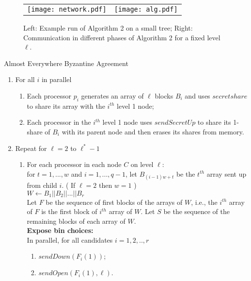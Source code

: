 \documentclass{sig-alternate}
\begin{document}
\begin{figure}[t]
\begin{center}
\begin{tabular}{ll}
\texttt{[image: network.pdf]} &
\texttt{[image: alg.pdf]}
\end{tabular}
\caption{Left: Example run of Algorithm 2 on a small tree; Right: Communication in different phases of Algorithm 2 for a fixed level $\ell$. }
\end{center}
\label{f:aeBA}
\end{figure}



\begin{algorithm} \label{aeBA}
\caption {Almost Everywhere Byzantine Agreement}
\begin{enumerate}
\item
For all $i$ in parallel
\begin{enumerate}
\item
 Each processor $p_i$ generates an array of  $\ell $ blocks  $B_i$ and  uses $secretshare$ to share its array with the $i^{th}$ level 1 node;
\item
Each processor in the $i^{th}$  level 1 node uses  $sendSecretUp$ to share its 1-share of $B_i$ with its parent node
and then erases its shares from memory.  \\
\end{enumerate}
\item
Repeat for $\ell=2$ to $\ell^*-1$\\
\begin{enumerate}
\item
For each processor in each node $C$ on level $\ell$:\\
   for $t=1,...,w$ and $i=1,...,q-1$, let  $B_{(i-1)w+t}$ be the $t^{th}$ array sent up from child $i$. 
( If $\ell =2  $ then $w=1$ ) \\
$W \leftarrow B_1 |  \! | B_2 | \! | ...| \! | B_{r}$  \\

Let $F$ be the sequence of first blocks of the arrays of $W$, i.e., the $i^{th}$ array of $F$ is the first block of $i^{th}$ array of $W$.  Let $S$ be the sequence of the remaining blocks  of each array of $W$.\\

 {\bf Expose bin choices:}\\
In parallel,  for all candidates $i=1, 2,..,r$

 \begin{enumerate}
\item
 $sendDown(F_i(1))$;
  \item
 $sendOpen(F_i(1), \ell)$. \\
\end{enumerate} 


\end{enumerate}
\end{enumerate}
\end{algorithm}
\end{document}
